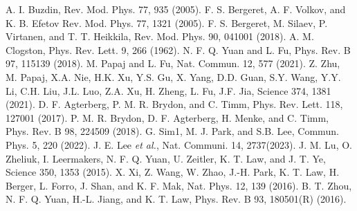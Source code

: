 \documentclass[aps, prb, twocolumn, amssymb, amsmath, showpacs, superscriptaddress]{revtex4-1}
\begin{document}
\begin{thebibliography}{00}
 A. I. Buzdin, Rev. Mod. Phys. 77, 935 (2005).
 F. S. Bergeret, A. F. Volkov, and K. B. Efetov Rev. Mod. Phys. 77, 1321 (2005).
 F. S. Bergeret, M. Silaev, P. Virtanen, and T. T. Heikkila, Rev. Mod. Phys. 90, 041001 (2018).
A. M. Clogston, Phys. Rev. Lett. 9, 266 (1962). %
N. F. Q. Yuan and L. Fu, Phys. Rev. B 97, 115139 (2018).
M. Papaj and L. Fu, Nat. Commun. 12, 577 (2021).
Z. Zhu, M. Papaj, X.A. Nie, H.K. Xu, Y.S. Gu, X. Yang, D.D. Guan, S.Y. Wang, Y.Y. Li, C.H. Liu, J.L. Luo, Z.A. Xu, H. Zheng, L. Fu, J.F. Jia, Science 374, 1381 (2021).
 D. F. Agterberg, P. M. R. Brydon, and C. Timm, Phys. Rev. Lett. 118, 127001 (2017).
 P. M. R. Brydon, D. F. Agterberg, H. Menke, and C. Timm, Phys. Rev. B 98, 224509 (2018).
 G. Sim1, M. J. Park, and S.B. Lee, Commun. Phys. 5, 220 (2022).
 J. E. Lee \textit{et al.}, Nat. Communi. 14, 2737(2023).
J. M. Lu, O. Zheliuk, I. Leermakers, N. F. Q. Yuan, U.
Zeitler, K. T. Law, and J. T. Ye, Science 350, 1353 (2015). %
X. Xi, Z. Wang, W. Zhao, J.-H. Park, K. T. Law, H. Berger,
L. Forro, J. Shan, and K. F. Mak, Nat. Phys. 12, 139 (2016). %
B. T. Zhou, N. F. Q. Yuan, H.-L. Jiang, and K. T. Law, Phys. Rev. B 93, 180501(R) (2016). %

\end{thebibliography}
\end{document}
